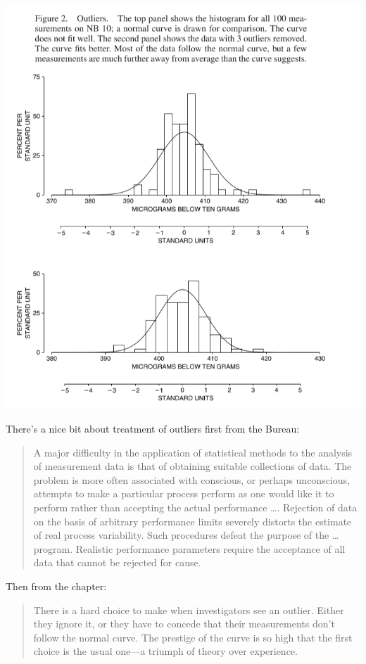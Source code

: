 \documentclass[
]{book}
\begin{document}
\includegraphics{images/Ch06Img01.png}

There's a nice bit about treatment of outliers first from the Bureau:

\begin{quote}
A major difficulty in the application of statistical methods to the analysis of measurement data is that of obtaining suitable collections of data. The problem is more often associated with conscious, or perhaps unconscious, attempts to make a particular process perform as one would like it to perform rather than accepting the actual performance \ldots. Rejection of data on the basis of arbitrary performance limits severely distorts the estimate of real process variability. Such procedures defeat the purpose of the \ldots{} program. Realistic performance parameters require the acceptance of all data that cannot be rejected for cause.
\end{quote}

Then from the chapter:

\begin{quote}
There is a hard choice to make when investigators see an outlier. Either they ignore it, or they have to concede that their measurements don't follow the normal curve. The prestige of the curve is so high that the first choice is the usual one---a triumph
of theory over experience.
\end{quote}
\end{document}
